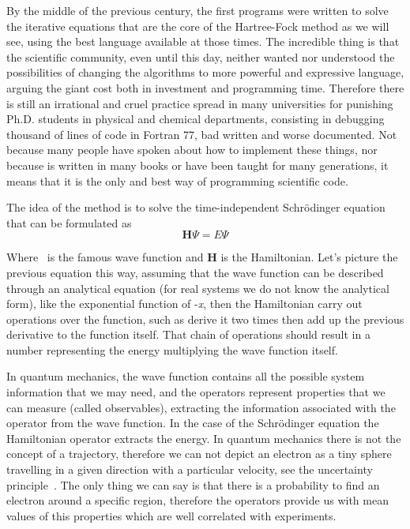 \documentclass{tmr}
\begin{document}
\par By the middle of the previous century, the first programs were written to solve the 
iterative equations that are the core of the Hartree-Fock method as we will see, using
the best language available at those times. The incredible thing is that the scientific community, even until
this day, neither wanted nor understood the possibilities of changing the algorithms to 
more powerful and expressive language, arguing the giant cost both in investment and programming time. Therefore 
there is still an irrational and cruel practice spread in many universities for punishing Ph.D. students
in physical and chemical departments, consisting in debugging thousand of lines of code in Fortran 77,
bad written and worse documented. Not because many people have spoken about how to implement
these things, nor because is written in many books or have been taught 
for many generations, it means that it is the only and best way of programming scientific code.

\par The idea of the method is to solve the time-independent Schr\"{o}dinger
 equation that can be formulated as
\[ \mathbf{H}\Psi = E\Psi \]

Where \textPsi\ is the famous wave function and \textbf{H} is the Hamiltonian. 
Let's picture the previous equation this way, assuming that the wave function 
can be described through an analytical equation (for real systems we do not know the analytical form),
like the exponential function of -\textit{\textalpha x},
then the Hamiltonian carry out operations over the function, such as derive it two times 
then add up the previous derivative to the function itself.
That chain of operations should result in a number representing the energy
multiplying the wave function itself.
\par In quantum mechanics, the wave function contains all the possible system information that 
we may need, and the operators represent properties that we can measure (called observables),
extracting the information associated with the operator from the wave function.
In the case of the Schr\"odinger equation the Hamiltonian operator extracts the energy. 
In quantum mechanics there is not the concept of a trajectory, therefore we can not depict an electron
as a tiny sphere travelling in a given direction with a particular velocity,
see the uncertainty principle~\cite{uncertainty}. The only thing
we can say is that there is a probability to find an electron
around a specific region, therefore the operators provide us with mean values of this properties which are
well correlated with experiments. 
\end{document}
